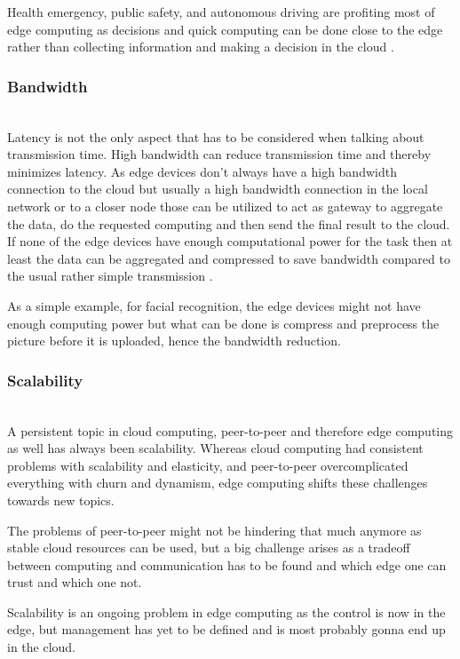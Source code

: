 Health emergency, public safety, and autonomous driving are profiting most of edge computing as decisions and quick computing can be done close to the edge rather than collecting information and making a decision in the cloud \cite{7488250}.

\subsubsection{Bandwidth}\hspace*{\fill} \\
Latency is not the only aspect that has to be considered when talking about transmission time. High bandwidth can reduce transmission time and thereby minimizes latency.
As edge devices don’t always have a high bandwidth connection to the cloud but usually a high bandwidth connection in the local network or to a closer node those can be utilized to act as gateway to aggregate the data, do the requested computing and then send the final result to the cloud. If none of the edge devices have enough computational power for the task then at least the data can be aggregated and compressed to save bandwidth compared to the usual rather simple transmission \cite{7488250}.

As a simple example, for facial recognition, the edge devices might not have enough computing power but what can be done is compress and preprocess the picture before it is uploaded, hence the bandwidth reduction.

\subsubsection{Scalability}\hspace*{\fill} \\
A persistent topic in cloud computing, peer-to-peer and therefore edge computing as well has always been scalability.
Whereas cloud computing had consistent problems with scalability and elasticity, and peer-to-peer overcomplicated everything with churn and dynamism, edge computing shifts these challenges towards new topics.

The problems of peer-to-peer might not be hindering that much anymore as stable cloud resources can be used, but a big challenge arises as a tradeoff between computing and communication has to be found \cite{7488250}\cite{GarciaLopez:2015:ECV:2831347.2831354} and which edge one can trust and which one not.

Scalability is an ongoing problem in edge computing as the control is now in the edge, but management has yet to be defined and is most probably gonna end up in the cloud.

